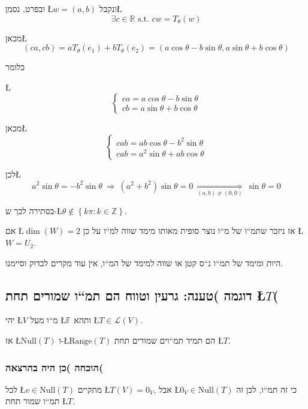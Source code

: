 \documentclass[english,hebrew]{article}
\begin{document}
ובפרט, נסמן \L{$w=\left(a,b\right)$} ונקבל\L{%
\[
\exists c\in\mathbb{R}\text{ s.t. }cw=T_{\theta}(w)
\]
}%

מכאן\L{%
\[
\left(ca,cb\right)=aT_{\theta}(e_{1})+bT_{\theta}(e_{2})=\left(a\cos\theta-b\sin\theta,a\sin\theta+b\cos\theta\right)
\]
}%

כלומר

\L{%
\[
\begin{cases}
ca=a\cos\theta-b\sin\theta\\
cb=a\sin\theta+b\cos\theta
\end{cases}
\]
}%

מכאן\L{%
\[
\begin{cases}
cab=ab\cos\theta-b^{2}\sin\theta\\
cab=a^{2}\sin\theta+ab\cos\theta
\end{cases}
\]
}%

לכן\L{%
\[
a^{2}\sin\theta=-b^{2}\sin\theta\ \Rightarrow\ \left(a^{2}+b^{2}\right)\sin\theta=0\ \underset{\left(a,b\right)\ne\left(0,0\right)}{\Rightarrow}\ \sin\theta=0
\]
}%

בסתירה לכך ש-\L{$\theta\notin\left\{ k\pi:k\in\mathbb{Z}\right\} $}.

אם \L{$\dim(W)=2$} אז ניזכר שתמ\textquotedblleft ו של מ\textquotedblleft ו
נוצר סופית מאותו מימד שווה למ\textquotedblleft ו על כן \L{$W=U_{2}$}.

היות ומימד של תמ\textquotedblleft ו נ\textquotedblleft ס קטן או שווה
למימד של המ\textquotedblleft ו, אין עוד מקרים לבדוק וסיימנו.

\subsection{דוגמה{\normalsize{} }{\normalsize{}\endL}{\normalsize{} )טענה:
גרעין וטווח הם תמ\textquotedblleft ו שמורים תחת \L{$T$}(}}

יהי \L{$V$} מ\textquotedblleft ו מעל \L{$\mathbb{F}$} ותהא \L{$T\in\mathcal{L}(V)$}.

אז \L{$\text{Null}(T)$} ו-\L{$\text{Range}(T)$} הם תמיד תמ\textquotedblleft וים
שמורים תחת \L{$T$}.

\subsubsection{הוכחה )כן היה בהרצאה(}

לכל \L{$v\in\text{Null}(T)$} מתקיים \L{$T(V)=0_{V}$}, אבל \L{$0_{V}\in\text{Null}\left(T\right)$}
כי זה תמ\textquotedblleft ו, לכן זה תמ\textquotedblleft ו שמור תחת
\L{$T$}.
\end{document}
